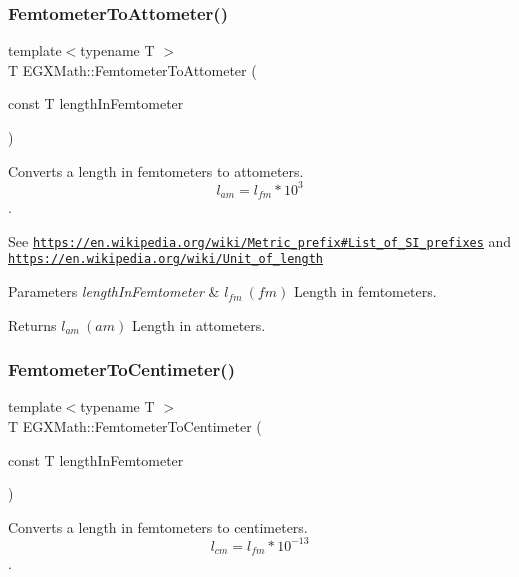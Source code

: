 \subsubsection{\texorpdfstring{Femtometer\+To\+Attometer()}{FemtometerToAttometer()}}
{\footnotesize\ttfamily template$<$typename T $>$ \\
T E\+G\+X\+Math\+::\+Femtometer\+To\+Attometer (\begin{DoxyParamCaption}\item[{const T}]{length\+In\+Femtometer }\end{DoxyParamCaption})}



Converts a length in femtometers to attometers. \[ l_{am}=l_{fm} * 10^{3} \]. 

See \href{https://en.wikipedia.org/wiki/Metric_prefix#List_of_SI_prefixes}{\tt https\+://en.\+wikipedia.\+org/wiki/\+Metric\+\_\+prefix\#\+List\+\_\+of\+\_\+\+S\+I\+\_\+prefixes} and \href{https://en.wikipedia.org/wiki/Unit_of_length}{\tt https\+://en.\+wikipedia.\+org/wiki/\+Unit\+\_\+of\+\_\+length} 
\begin{DoxyParams}{Parameters}
{\em length\+In\+Femtometer} & $ l_{fm}\ (fm)$ Length in femtometers. \\
\hline
\end{DoxyParams}
\begin{DoxyReturn}{Returns}
$ l_{am}\ (am)$ Length in attometers. 
\end{DoxyReturn}
\mbox{\label{group___e_g_x_math-_conversions-_length_conversions-_femtometer-_s_i_ga9a7e58a22b438341f8fffc8d78dd8483}} 
\subsubsection{\texorpdfstring{Femtometer\+To\+Centimeter()}{FemtometerToCentimeter()}}
{\footnotesize\ttfamily template$<$typename T $>$ \\
T E\+G\+X\+Math\+::\+Femtometer\+To\+Centimeter (\begin{DoxyParamCaption}\item[{const T}]{length\+In\+Femtometer }\end{DoxyParamCaption})}



Converts a length in femtometers to centimeters. \[ l_{cm}=l_{fm} * 10^{-13} \]. 

